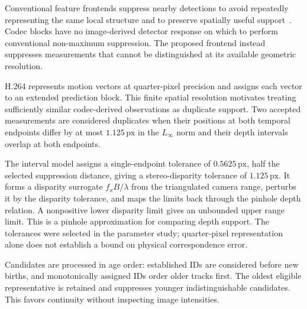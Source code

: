 Conventional feature frontends suppress nearby detections to avoid repeatedly representing the same local structure and to preserve spatially useful support~\cite{qin2018vins,kuhne2025lowlatency}. Codec blocks have no image-derived detector response on which to perform conventional non-maximum suppression. The proposed frontend instead suppresses measurements that cannot be distinguished at its available geometric resolution.

H.264 represents motion vectors at quarter-pixel precision and assigns each
vector to an extended prediction block. This finite spatial resolution motivates
treating sufficiently similar codec-derived observations as duplicate support.
Two accepted measurements are considered duplicates when their positions at both
temporal endpoints differ by at most $1.125\,\mathrm{px}$ in the $L_\infty$ norm
and their depth intervals overlap at both endpoints.

The interval model assigns a single-endpoint tolerance of $0.5625\,\mathrm{px}$,
half the selected suppression distance, giving a stereo-disparity tolerance of
$1.125\,\mathrm{px}$. It forms a disparity surrogate $f_xB/\lambda$ from the
triangulated camera range, perturbs it by the disparity tolerance, and maps the
limits back through the pinhole depth relation. A nonpositive lower disparity
limit gives an unbounded upper range limit. This is a pinhole approximation for
comparing depth support. The tolerances were selected in the parameter study;
quarter-pixel representation alone does not establish a bound on physical
correspondence error.

Candidates are processed in age order: established IDs are considered before new
births, and monotonically assigned IDs order older tracks first. The oldest
eligible representative is retained and suppresses younger indistinguishable
candidates. This favors continuity without inspecting image intensities.

